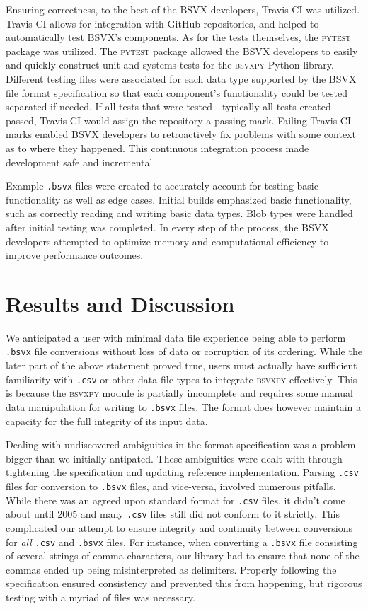 \documentclass[10pt]{article}
\begin{document}
\indent{}
Ensuring correctness, to the best of the BSVX developers, Travis-CI was utilized.
Travis-CI allows for integration with GitHub repositories, and helped to automatically test BSVX's components.
As for the tests themselves, the \textsc{pytest} package was utilized.
The \textsc{pytest} package allowed the BSVX developers to easily and quickly construct unit and systems tests for the \textsc{bsvxpy} Python library.
Different testing files were associated for each data type supported by the BSVX file format specification so that each component's functionality could be tested separated if needed.
If all tests that were tested---typically all tests created---passed, Travis-CI would assign the repository a passing mark.
Failing Travis-CI marks enabled BSVX developers to retroactively fix problems with some context as to where they happened.
This continuous integration process made development safe and incremental.

\indent{}
Example \texttt{.bsvx} files were created to accurately account for testing basic functionality as well as edge cases.
Initial builds emphasized basic functionality, such as correctly reading and writing basic data types.
Blob types were handled after initial testing was completed.
In every step of the process, the BSVX developers attempted to optimize memory and computational efficiency to improve performance outcomes.

\section*{Results and Discussion}

\indent{}
We anticipated a user with minimal data file experience being able to perform \texttt{.bsvx} file conversions without loss of data or corruption of its ordering.
While the later part of the above statement proved true, users must actually have sufficient familiarity with \texttt{.csv} or other data file types to integrate \textsc{bsvxpy} effectively.
This is because the \textsc{bsvxpy} module is partially imcomplete and requires some manual data manipulation for writing to \texttt{.bsvx} files. 
The format does however maintain a capacity for the full integrity of its input data.

\indent{}
Dealing with undiscovered ambiguities in the format specification was a problem bigger than we initially antipated.
These ambiguities were dealt with through tightening the specification and updating reference implementation.
Parsing \texttt{.csv} files for conversion to \texttt{.bsvx} files, and vice-versa, involved numerous pitfalls.
While there was an agreed upon standard format for \texttt{.csv} files, it didn’t come about until 2005 and many \texttt{.csv} files still did not conform to it strictly.
This complicated our attempt to ensure integrity and continuity between conversions for \textit{all} \texttt{.csv} and \texttt{.bsvx} files.
For instance, when converting a \texttt{.bsvx} file consisting of several strings of comma characters, our library had to ensure that none of the commas ended up being misinterpreted as delimiters.
Properly following the specification ensured consistency and prevented this from happening, but rigorous testing with a myriad of files was necessary.
\end{document}
